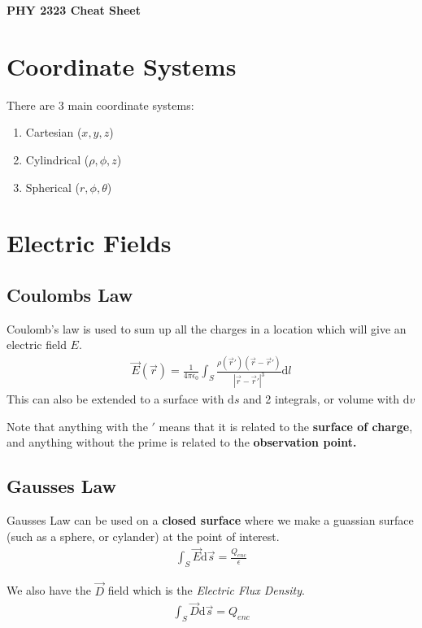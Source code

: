 \documentclass[12pt,letterpaper]{article} \usepackage{amsmath} \usepackage{graphicx} \usepackage[margin=1in]{geometry} \usepackage{longtable}  \usepackage{amssymb}
\begin{document}
	
	\begin{center}
		\Large\textbf{PHY 2323 Cheat Sheet} \\
		\vspace{0.5em}
	\end{center}
	
	\section{Coordinate Systems}
	There are 3 main coordinate systems:
	\begin{enumerate}[]
		\item Cartesian ($x,y,z$)
		\item Cylindrical ($\rho, \phi, z$)
		\item Spherical ($r,\phi, \theta$)
	\end{enumerate}
	
	\section{Electric Fields}
	
	\subsection{Coulombs Law}
	Coulomb's law is used to sum up all the charges in a location which will give an electric field $E$.
	\begin{align*}
		\vec E (\vec r) = \frac{1}{4\pi \epsilon_0} \int_S \frac{\rho(\vec r\prime)(\vec r - \vec r\prime)}{|\vec r - \vec r\prime | ^3}\mathrm d l
	\end{align*}
	This can also be extended to a surface with $\mathrm ds$ and 2 integrals, or volume with $\mathrm dv$
	
	Note that anything with the $\prime$ means that it is related to the \textbf{surface of charge}, and anything without the prime is related to the \textbf{observation point.}
	
	\subsection{Gausses Law}
	Gausses Law can be used on a \textbf{closed surface} where we make a guassian surface (such as a sphere, or cylander) at the point of interest. 
	\begin{align*}
		\int_S \vec E \mathrm d \vec s = \frac{Q_{enc}}{\epsilon}
	\end{align*}

	We also have the $\vec D$ field which is the \textit{Electric Flux Density}.
	\begin{align*}
		\int_S \vec D \mathrm d \vec s = Q_{enc}
	\end{align*}
	
\end{document}
